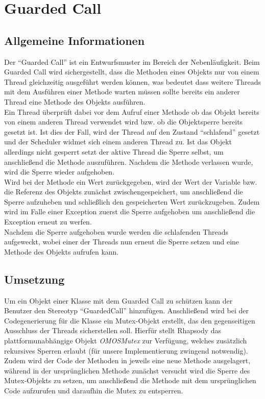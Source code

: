 \chapter{Guarded Call}

\section{Allgemeine Informationen}
Der \enquote{Guarded Call} ist ein Entwurfsmuster im Bereich der Nebenläufigkeit. Beim Guarded Call wird sichergestellt, dass die Methoden eines Objekts nur von einem Thread gleichzeitig ausgeführt werden können, was bedeutet dass weitere Threads mit dem Ausführen einer Methode warten müssen sollte bereits ein anderer Thread eine Methode des Objekts ausführen. \cite[S. 190]{douglass2010design}
\\
Ein Thread überprüft dabei vor dem Aufruf einer Methode ob das Objekt bereits von einem anderen Thread verwendet wird bzw. ob die Objektsperre bereits gesetzt ist. Ist dies der Fall, wird der Thread auf den Zustand \enquote{schlafend} gesetzt und der Scheduler widmet sich einem anderen Thread zu. Ist das Objekt allerdings nicht gesperrt setzt der aktive Thread die Sperre selbst, um anschließend die Methode auszuführen. Nachdem die Methode verlassen wurde, wird die Sperre wieder aufgehoben.
\\
Wird bei der Methode ein Wert zurückgegeben, wird der Wert der Variable bzw. die Referenz des Objekts zunächst zwischengespeichert, um anschließend die Sperre aufzuheben und schließlich den gespeicherten Wert zurückzugeben. Zudem wird im Falle einer Exception zuerst die Sperre aufgehoben um anschließend die Exception erneut zu werfen.
\\
Nachdem die Sperre aufgehoben wurde werden die schlafenden Threads aufgeweckt, wobei einer der Threads nun erneut die Sperre setzen und eine Methode des Objekts aufrufen kann.

\section{Umsetzung}
Um ein Objekt einer Klasse mit dem Guarded Call zu schützen kann der Benutzer den Stereotyp \enquote{GuardedCall} hinzufügen. Anschließend wird bei der Codegenerierung für die Klasse ein Mutex-Objekt erstellt, das den gegenseitigen Ausschluss der Threads sicherstellen soll. Hierfür stellt Rhapsody das plattformunabhängige Objekt \textit{OMOSMutex} zur Verfügung, welches zusätzlich rekursives Sperren erlaubt (für unsere Implementierung zwingend notwendig).
\\
Zudem wird der Code der Methoden in jeweils eine neue Methode ausgelagert, während in der ursprünglichen Methode zunächst versucht wird die Sperre des Mutex-Objekts zu setzen, um anschließend die Methode mit dem ursprünglichen Code aufzurufen und daraufhin die Mutex zu entsperren.

